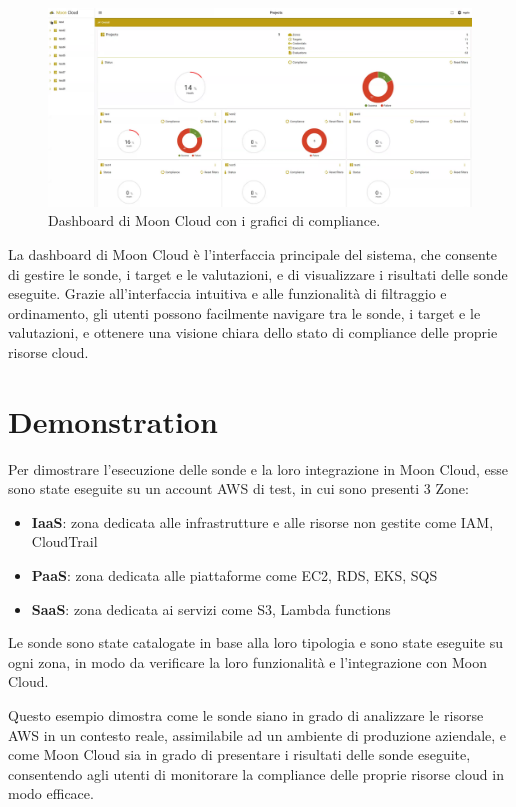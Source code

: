 \begin{center}
\begin{figure}
\centering
\includegraphics[width=\textwidth]{immagini/homepage.png}
\caption{Dashboard di Moon Cloud con i grafici di compliance.}
\label{fig:dashboardMoon Cloud}
\end{figure}
\end{center}

La dashboard di Moon Cloud è l'interfaccia principale del sistema, che consente di gestire le sonde, i target e le valutazioni, e di visualizzare i risultati delle sonde eseguite. Grazie all'interfaccia intuitiva e alle funzionalità di filtraggio e ordinamento, gli utenti possono facilmente navigare tra le sonde, i target e le valutazioni, e ottenere una visione chiara dello stato di compliance delle proprie risorse cloud. 

\section{Demonstration}
\label{sec:demonstration}

Per dimostrare l'esecuzione delle sonde e la loro integrazione in Moon Cloud, esse sono state eseguite su un account AWS di test, in cui sono presenti 3 Zone:

\begin{itemize}
    \item \textbf{IaaS}: zona dedicata alle infrastrutture e alle risorse non gestite come IAM, CloudTrail
    \item \textbf{PaaS}: zona dedicata alle piattaforme come EC2, RDS, EKS, SQS
    \item \textbf{SaaS}: zona dedicata ai servizi come S3, Lambda functions
\end{itemize}

Le sonde sono state catalogate in base alla loro tipologia e sono state eseguite su ogni zona, in modo da verificare la loro funzionalità e l'integrazione con Moon Cloud.

Questo esempio dimostra come le sonde siano in grado di analizzare le risorse AWS in un contesto reale, assimilabile ad un ambiente di produzione aziendale, e come Moon Cloud sia in grado di presentare i risultati delle sonde eseguite, consentendo agli utenti di monitorare la compliance delle proprie risorse cloud in modo efficace.